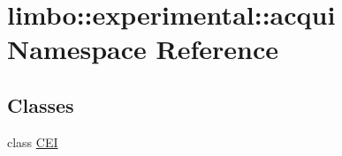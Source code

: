 \hypertarget{namespacelimbo_1_1experimental_1_1acqui}{}\section{limbo\+:\+:experimental\+:\+:acqui Namespace Reference}
\label{namespacelimbo_1_1experimental_1_1acqui}
\subsection*{Classes}
\begin{DoxyCompactItemize}
\item 
class \hyperlink{classlimbo_1_1experimental_1_1acqui_1_1_c_e_i}{C\+E\+I}
\end{DoxyCompactItemize}
